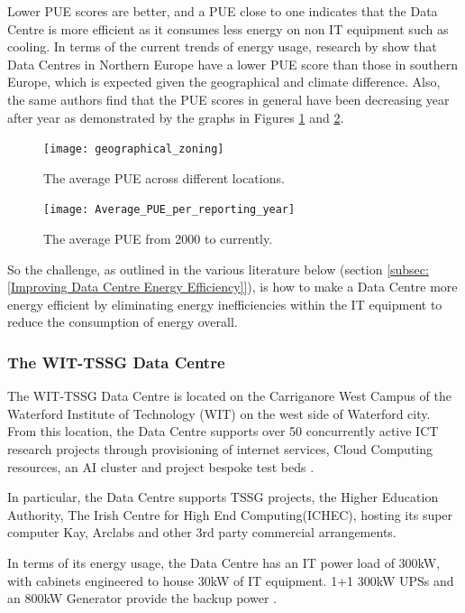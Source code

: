 \documentclass[12pt]{scrartcl}
\begin{document}
Lower PUE scores are better, and a PUE close to one indicates that the Data Centre is more efficient as it consumes less energy on non IT equipment such as cooling. 
In terms of the current trends of energy usage, research by \citet{edsbas.13818AC20170101} show that Data Centres in Northern Europe have a lower PUE score than those in southern Europe, which is expected given the geographical and climate difference. Also, the same authors find that the PUE scores in general have been decreasing year after year as demonstrated by the graphs in Figures \ref{fig:PUE-by-location} and \ref{fig:PUE-by-year}.

\begin{figure}[h]
  \caption{The average PUE across different locations.}
  \label{fig:PUE-by-location}
  \centering
    \texttt{[image: geographical\_zoning]}
\end{figure}

\begin{figure}[h]
  \caption{The average PUE from 2000 to currently.}
  \label{fig:PUE-by-year}
  \centering
    \texttt{[image: Average\_PUE\_per\_reporting\_year]}
\end{figure}
 
So the challenge, as outlined in the various literature below (section \ref{subsec:[Improving Data Centre Energy Efficiency]}), is how to make a Data Centre more energy efficient by eliminating energy inefficiencies within the IT equipment to reduce the consumption of energy overall. 

\subsubsection{The WIT-TSSG Data Centre}
\label{subsubsec:[The WIT-TSSG Data Centre]}

The WIT-TSSG Data Centre is located on the Carriganore West Campus of the Waterford Institute of Technology (WIT) on the west side of Waterford city. From this location, the Data Centre supports over 50 concurrently active ICT research projects through provisioning of internet services, Cloud Computing resources, an AI cluster and project bespoke test beds \citep{TSSG}. 

In particular, the Data Centre supports TSSG projects, the Higher Education Authority, The Irish Centre for High End Computing(ICHEC), hosting its super computer Kay, Arclabs and other 3rd party commercial arrangements.

In terms of its energy usage, the Data Centre has an IT power load of 300kW, with cabinets engineered to house 30kW of IT equipment. 1+1 300kW UPSs and an 800kW Generator provide the backup power \citep{TSSG}.
\end{document}

